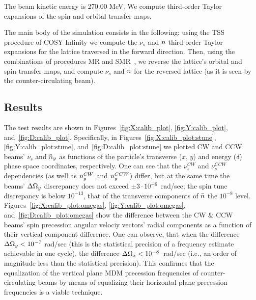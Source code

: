 The beam kinetic energy is 270.00 MeV. We compute third-order Taylor expansions of the
spin and orbital transfer maps.

The main body of the simulation consists in the following: using the TSS~\cite[p.~41]{COSYINF:Manual:BeamPhys}
procedure
of COSY Infinity we compute the $\nu_s$ and $\bar n$ third-order Taylor expansions for the lattice traversed
in the forward direction.
Then, using the combinations of procedures MR and SMR~\cite[p.~233]{Eremey:Thesis}, we reverse
the lattice's orbital and spin transfer maps, and compute $\nu_s$ and $\bar n$
for the reversed lattice (as it is seen by the counter-circulating beam).


\subsection{Results}

The test results are shown in Figures~\ref{fig:X:calib_plot}, \ref{fig:Y:calib_plot}, and~\ref{fig:D:calib_plot}. Specifically, in Figures~\ref{fig:X:calib_plot:stune},
\ref{fig:Y:calib_plot:stune}, and~\ref{fig:D:calib_plot:stune} we plotted CW and CCW beams' $\nu_s$ and $\bar n_y$
as functions of the particle's transverse ($x$, $y$) and energy ($\delta$) phase space coordinates,
 respectively. One can see that the $\nu_s^{CW}$ and $\nu_s^{CCW}$ dependencies (as well as
$\bar n_y^{CW}$ and $\bar n_y^{CCW}$) differ, but at the same time the beams' $\Delta\Omega_y$ discrepancy does not
exceed $\pm3\cdot10^{-6}$~rad/sec; the spin tune discrepancy is below $10^{-13}$, that of the transverse
components of $\bar n$ the $10^{-8}$ level. Figures~\ref{fig:X:calib_plot:omegas}, \ref{fig:Y:calib_plot:omegas},
and~\ref{fig:D:calib_plot:omegas} show the difference between the CW \& CCW beams' spin precession
angular velociy vectors' radial components as a function of their vertical component difference. 
One can observe,
that when the difference $\Delta\Omega_y < 10^{-7}$ rad/sec (this is the statistical precision
of a frequency estimate achievable in one cycle), the difference $\Delta \Omega_x < 10^{-8}$~rad/sec (i.e.,
an order of magnitude less than the statistical precision).
This confirmes that the equalization of the vertical plane MDM precession frequencies of counter-circulating
beams by means of equalizing their horizontal plane precession frequencies is a viable technique.

